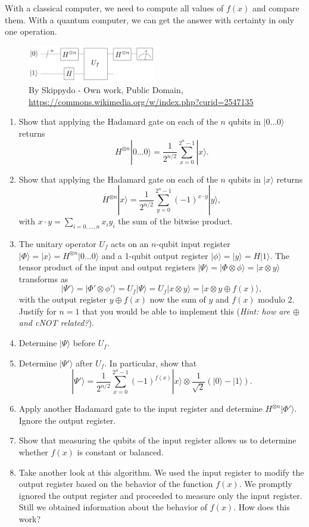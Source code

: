 \documentclass[letterpaper,11pt]{article}
\begin{document}
\begin{enumerate}
  With a classical computer, we need to compute all values of $f(x)$ and compare them. With a quantum computer, we can get the answer with certainty in only one operation.
  \begin{figure}
    \begin{center}
      \includegraphics[width=0.5\textwidth]{images/Deutsch-Jozsa_Algorithm}
    \end{center}
    \caption{By Skippydo - Own work, Public Domain, \url{https://commons.wikimedia.org/w/index.php?curid=2547135}}
    \label{fig:deutsch}
  \end{figure}
  \begin{enumerate}
    \item Show that applying the Hadamard gate on each of the $n$ qubits in $|0 \ldots 0\rangle$ returns
    $$ H^{\otimes n}|0 \ldots 0\rangle = \frac{1}{2^{n/2}} \sum_{x=0}^{2^n-1} |x\rangle. $$
    \item Show that applying the Hadamard gate on each of the $n$ qubits in $|x\rangle$ returns
    $$ H^{\otimes n}|x\rangle = \frac{1}{2^{n/2}} \sum_{y=0}^{2^n-1} (-1)^{x \cdot y} |y\rangle, $$
    with $x \cdot y = \sum_{i=0,\ldots,n} x_i y_i$ the sum of the bitwise product.
    \item The unitary operator $U_f$ acts on an $n$-qubit input register $|\Phi\rangle = |x\rangle = H^{\otimes n}|0 \ldots 0\rangle$ and a 1-qubit output register $|\phi\rangle = |y\rangle= H|1\rangle$. The tensor product of the input and output registers $|\Psi\rangle = |\Phi \otimes \phi\rangle = |x \otimes y\rangle$ transforms as
    $$ |\Psi'\rangle = |\Phi' \otimes \phi' \rangle = U_f |\Psi\rangle = U_f |x \otimes y\rangle = |x \otimes y \oplus f(x)\rangle, $$
    with the output register $y \oplus f(x)$ now the sum of $y$ and $f(x)$ modulo 2. Justify for $n = 1$ that you would be able to implement this (\emph{Hint: how are $\oplus$ and cNOT related?}).
    \item Determine $|\Psi\rangle$ before $U_f$.
    \item Determine $|\Psi'\rangle$ after $U_f$. In particular, show that
    $$ |\Psi'\rangle = \frac{1}{2^{n/2}} \sum_{x=0}^{2^n-1} (-1)^{f(x)} |x\rangle \otimes \frac{1}{\sqrt{2}} (|0\rangle - |1\rangle). $$
    \item Apply another Hadamard gate to the input register and determine $H^{\otimes n} |\Phi'\rangle$. Ignore the output register.
    \item Show that measuring the qubits of the input register allows us to determine whether $f(x)$ is constant or balanced.
    \item Take another look at this algorithm. We used the input register to modify the output register based on the behavior of the function $f(x)$. We promptly ignored the output register and proceeded to measure only the input register. Still we obtained information about the behavior of $f(x)$. How does this work?
  \end{enumerate}
\end{enumerate}
\end{document}
